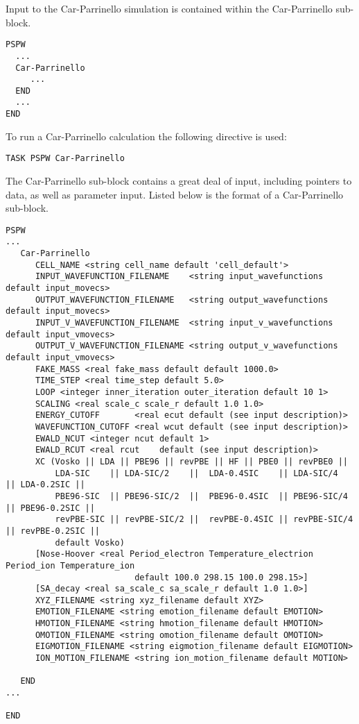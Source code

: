 Input to the Car-Parrinello simulation is contained within the
Car-Parrinello sub-block.
\begin{verbatim}
PSPW
  ...
  Car-Parrinello
     ...
  END
  ...
END
\end{verbatim}
To run a Car-Parrinello calculation the following directive is used:
\begin{verbatim}
TASK PSPW Car-Parrinello 
\end{verbatim}
The Car-Parrinello sub-block contains a great deal
of input, including pointers to data, as well as
parameter input.  Listed below is the format of a Car-Parrinello sub-block.
\begin{verbatim}
PSPW
...
   Car-Parrinello
      CELL_NAME <string cell_name default 'cell_default'>
      INPUT_WAVEFUNCTION_FILENAME    <string input_wavefunctions    default input_movecs>
      OUTPUT_WAVEFUNCTION_FILENAME   <string output_wavefunctions   default input_movecs>
      INPUT_V_WAVEFUNCTION_FILENAME  <string input_v_wavefunctions  default input_vmovecs>
      OUTPUT_V_WAVEFUNCTION_FILENAME <string output_v_wavefunctions default input_vmovecs>
      FAKE_MASS <real fake_mass default default 1000.0>
      TIME_STEP <real time_step default 5.0>
      LOOP <integer inner_iteration outer_iteration default 10 1>
      SCALING <real scale_c scale_r default 1.0 1.0>
      ENERGY_CUTOFF       <real ecut default (see input description)>
      WAVEFUNCTION_CUTOFF <real wcut default (see input description)>
      EWALD_NCUT <integer ncut default 1>
      EWALD_RCUT <real rcut    default (see input description)>
      XC (Vosko || LDA || PBE96 || revPBE || HF || PBE0 || revPBE0 || 
          LDA-SIC    || LDA-SIC/2    ||  LDA-0.4SIC    || LDA-SIC/4    || LDA-0.2SIC ||
          PBE96-SIC  || PBE96-SIC/2  ||  PBE96-0.4SIC  || PBE96-SIC/4  || PBE96-0.2SIC ||
          revPBE-SIC || revPBE-SIC/2 ||  revPBE-0.4SIC || revPBE-SIC/4 || revPBE-0.2SIC ||
          default Vosko)
      [Nose-Hoover <real Period_electron Temperature_electrion Period_ion Temperature_ion 
                          default 100.0 298.15 100.0 298.15>]
      [SA_decay <real sa_scale_c sa_scale_r default 1.0 1.0>]
      XYZ_FILENAME <string xyz_filename default XYZ>
      EMOTION_FILENAME <string emotion_filename default EMOTION>
      HMOTION_FILENAME <string hmotion_filename default HMOTION>
      OMOTION_FILENAME <string omotion_filename default OMOTION>
      EIGMOTION_FILENAME <string eigmotion_filename default EIGMOTION>
      ION_MOTION_FILENAME <string ion_motion_filename default MOTION>

   END
...

END
\end{verbatim}
